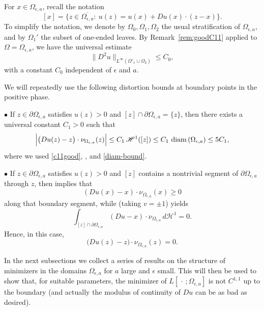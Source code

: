 \documentclass[reqno,11pt]{amsart}
\def\diam{{\mathop\mathrm{\,diam\,}}}
\numberwithin{equation}{section}
\theoremstyle{remark}
\begin{document}
For $x\in\Omega_{\epsilon,a}$, recall the notation
\[
[x]=\{z\in\overline{\Omega_{\epsilon,a}}:\ u(z)=u(x)+Du(x)\cdot(z-x)\}.
\]
To simplify the notation, we denote by $\Omega_0,\Omega_1,\Omega_2$ the usual stratification of $\Omega_{\epsilon,a}$, and by $\Omega_1'$ the subset of one-ended leaves.
By Remark~\ref{rem:goodC11} applied to $\Omega=\Omega_{\epsilon,a}$,
we have the universal estimate
\begin{equation}\label{c11good}
\|D^2u\|_{L^\infty(\Omega'_{1}\cup\Omega_{2})}\le C_0,
\end{equation}
with a constant $C_0$ independent of $\epsilon$ and $a$.

We will repeatedly use the following distortion bounds at boundary points in the positive phase.

\smallskip
\noindent$\bullet$ If $z\in\partial\Omega_{\epsilon,a}$ satisfies $u(z)>0$ and
$[z]\cap\partial\Omega_{\epsilon,a}=\{z\}$, then there exists a universal constant $C_1>0$ such that
\begin{equation}\label{distortion-good}
\Bigl|\bigl(Du(z)-z\bigr)\cdot \nu_{\Omega_{\epsilon,a}}(z)\Bigr|
\le C_1\,\mathscr H^1([z])
\le C_1\,\diam(\Omega_{\epsilon,a})
\le 5 C_1,
\end{equation}
where we used \eqref{c11good}, \cite[Proposition~5.4]{MRZ20252}, and \eqref{diam-bound}.

\smallskip
\noindent$\bullet$ If $z\in\partial\Omega_{\epsilon,a}$ satisfies $u(z)>0$ and $[z]$
contains a nontrivial segment of $\partial\Omega_{\epsilon,a}$ through $z$, then
\cite[Proposition~2.3]{MRZ20252} implies that
\[
(Du(x)-x)\cdot\nu_{\Omega_{\epsilon,a}}(x)\ge0
\]
along that boundary segment, while \cite[Corollary~A.9]{MRZ20252} (taking $v=\pm1$) yields
\[
\int_{[z]\cap\partial\Omega_{\epsilon,a}}
(Du-x)\cdot\nu_{\Omega_{\epsilon,a}}\,d\mathscr H^1=0.
\]
Hence, in this case,
\begin{equation}\label{distortion-zero}
\bigl(Du(z)-z\bigr)\cdot \nu_{\Omega_{\epsilon,a}}(z)=0.
\end{equation}

In the next subsections we collect a series of results on the structure of minimizers in the
domains $\Omega_{\epsilon,a}$ for $a$ large and $\epsilon$ small. This will then be used to show
that, for suitable parameters, the minimizer of $L[\,\cdot\,;\Omega_{\epsilon,a}]$ is not
$C^{1,1}$ up to the boundary (and actually the modulus of continuity of $Du$ can be as bad as desired).

\end{document}
